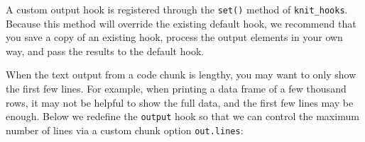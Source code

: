 \documentclass[
  a4paper,
  twoside,
  openright]{book}
\newenvironment{Shaded}{\begin{snugshade}}{\end{snugshade}}
\newcommand{\AttributeTok}[1]{\textcolor[rgb]{0.13,0.29,0.53}{#1}}
\newcommand{\CommentTok}[1]{\textcolor[rgb]{0.56,0.35,0.01}{\textit{#1}}}
\newcommand{\ControlFlowTok}[1]{\textcolor[rgb]{0.13,0.29,0.53}{\textbf{#1}}}
\newcommand{\FunctionTok}[1]{\textcolor[rgb]{0.13,0.29,0.53}{\textbf{#1}}}
\newcommand{\NormalTok}[1]{#1}
\newcommand{\OtherTok}[1]{\textcolor[rgb]{0.56,0.35,0.01}{#1}}
\newcommand{\SpecialCharTok}[1]{\textcolor[rgb]{0.81,0.36,0.00}{\textbf{#1}}}
\newcommand{\StringTok}[1]{\textcolor[rgb]{0.31,0.60,0.02}{#1}}
\theoremstyle{definition}
\theoremstyle{definition}
\theoremstyle{definition}
\theoremstyle{definition}
\theoremstyle{remark}
\begin{document}
\begin{Shaded}
\end{Shaded}

A custom output hook is registered through the \texttt{set()} method of \texttt{knit\_hooks}. Because this method will override the existing default hook, we recommend that you save a copy of an existing hook, process the output elements in your own way, and pass the results to the default hook.

When the text output from a code chunk is lengthy, you may want to only show the first few lines. For example, when printing a data frame of a few thousand rows, it may not be helpful to show the full data, and the first few lines may be enough. Below we redefine the \texttt{output} hook so that we can control the maximum number of lines via a custom chunk option \texttt{out.lines}:

\begin{Shaded}
\end{Shaded}
\end{document}
